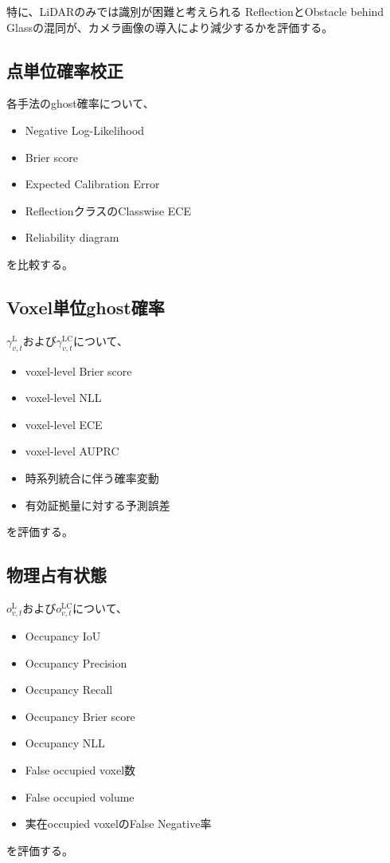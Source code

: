 \documentclass[uplatex,a4paper,11pt]{jsarticle}
\begin{document}
特に、LiDARのみでは識別が困難と考えられる
ReflectionとObstacle behind Glassの混同が、カメラ画像の導入により減少するかを評価する。

\subsection{点単位確率校正}

各手法のghost確率について、
\begin{itemize}
  \item Negative Log-Likelihood
  \item Brier score
  \item Expected Calibration Error
  \item ReflectionクラスのClasswise ECE
  \item Reliability diagram
\end{itemize}
を比較する。

\subsection{Voxel単位ghost確率}

$\gamma_{v,t}^{\mathrm{L}}$および$\gamma_{v,t}^{\mathrm{LC}}$について、
\begin{itemize}
  \item voxel-level Brier score
  \item voxel-level NLL
  \item voxel-level ECE
  \item voxel-level AUPRC
  \item 時系列統合に伴う確率変動
  \item 有効証拠量に対する予測誤差
\end{itemize}
を評価する。

\subsection{物理占有状態}

$o_{v,t}^{\mathrm{L}}$および$o_{v,t}^{\mathrm{LC}}$について、
\begin{itemize}
  \item Occupancy IoU
  \item Occupancy Precision
  \item Occupancy Recall
  \item Occupancy Brier score
  \item Occupancy NLL
  \item False occupied voxel数
  \item False occupied volume
  \item 実在occupied voxelのFalse Negative率
\end{itemize}
を評価する。
\end{document}
